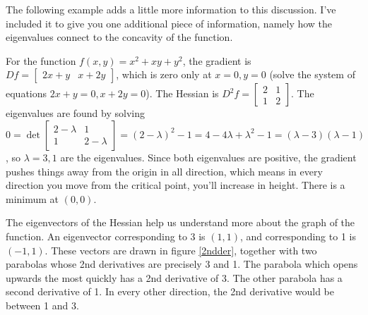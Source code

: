 The following example adds a little more information to this discussion. I've included it to give you one additional piece of information, namely how the eigenvalues connect to the concavity of the function. 

\begin{example}
For the function {$f(x,y)=x^2+xy+y^2$}, the gradient is $Df = \begin{bmatrix}2x+y&x+2y \end{bmatrix}$, which is zero only at $x=0,y=0$ (solve the system of equations $2x+y=0,x+2y=0$). The Hessian is $D^2f = \begin{bmatrix}2&1 \\1&2\end{bmatrix}$. The eigenvalues are found by solving $0=\det \begin{bmatrix}2-\lambda &1 \\1&2-\lambda \end{bmatrix} = (2-\lambda)^2-1 = 4-4\lambda+\lambda^2 -1 = (\lambda-3)(\lambda-1)$, so $\lambda = 3,1$ are the eigenvalues.  Since both eigenvalues are positive, the gradient pushes things away from the origin in all direction, which means in every direction you move from the critical point, you'll increase in height.  There is a minimum at $(0,0)$.  

The eigenvectors of the Hessian help us understand more about the graph of the function.  An eigenvector corresponding to 3 is $(1,1)$, and corresponding to 1 is $(-1,1)$. These vectors are drawn in figure \ref{2ndder}, together with two parabolas whose 2nd derivatives are precisely 3 and 1.  The parabola which opens upwards the most quickly has a 2nd derivative of 3.  The other parabola has a second derivative of 1. In every other direction, the 2nd derivative would be between 1 and 3.
\end{example}

